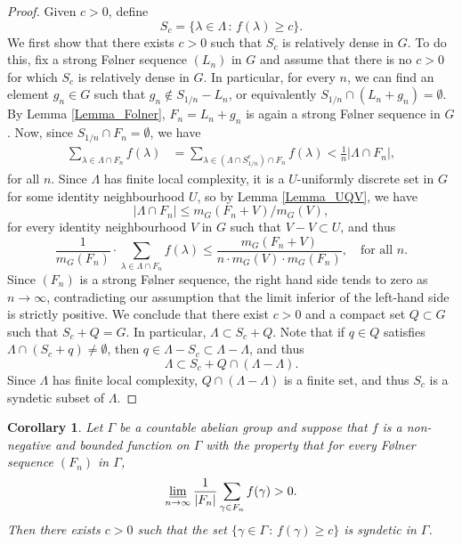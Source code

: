 \documentclass[12pt,reqno,a4paper]{amsart}
\numberwithin{equation}{section}
\newcommand{\ra}{\rightarrow}
\theoremstyle{theorem}
\newtheorem{corollary}[theorem]{Corollary}
\theoremstyle{task}
\theoremstyle{definition}
\begin{document}
\begin{proof}
Given $c > 0$, define
\[
S_c = \{ \lambda \in \Lambda \, : \, f(\lambda) \geq c \}.
\]
We first show that there exists $c > 0$ such that $S_c$ is relatively dense in $G$. To do this, fix a strong F\o lner sequence $(L_n)$ in $G$ and assume that there is no $c > 0$ for which $S_c$ is relatively dense in $G$. In particular, for every $n$, we can find an element $g_n \in G$ such that $g_n \notin S_{1/n} - L_n$, or equivalently 
$S_{1/n} \cap (L_n + g_n) = \emptyset$. By Lemma \ref{Lemma_Folner}, $F_n = L_n + g_n$ is again a strong F\o lner sequence in $G$. Now, since $S_{1/n} \cap F_n = \emptyset$, we have
\begin{align*}
\sum_{\lambda \in \Lambda \cap F_n} f(\lambda)
&= \sum_{\lambda \in (\Lambda \cap S^c_{1/n}) \cap F_n} f(\lambda) < \frac{1}{n} |\Lambda \cap F_n|,
\end{align*}
for all $n$. Since $\Lambda$ has finite local complexity, it is a $U$-uniformly discrete set in $G$ for some identity neighbourhood $U$, so by Lemma \ref{Lemma_UQV},
we have 
\[
|\Lambda \cap F_n| \leq m_G(F_n+V)/m_G(V),
\]
for every identity neighbourhood $V$ in $G$ such that $V-V \subset U$, and thus
\[
\frac{1}{m_G(F_n)} \cdot 
\sum_{\lambda \in \Lambda \cap F_n} f(\lambda) \leq \frac{m_G(F_n +V)}{n \cdot m_G(V) \cdot m_G(F_n)}, \quad \textrm{for all $n$}.
\]
Since $(F_n)$ is a strong F\o lner sequence, the right hand side tends to zero as $n \ra \infty$,
contradicting our assumption that the limit inferior of the left-hand side is strictly positive. We conclude that there exist $c > 0$ and a compact set $Q \subset G$ such that $S_c + Q = G$. In particular, $\Lambda \subset S_c + Q$. Note that if $q \in Q$
satisfies $\Lambda \cap (S_c + q) \neq \emptyset$, then $q \in \Lambda - S_c \subset \Lambda - \Lambda$, and thus
\[
\Lambda \subset S_c + Q \cap (\Lambda - \Lambda).
\]
Since $\Lambda$ has finite local complexity, $Q \cap (\Lambda - \Lambda)$ is a finite set, and thus $S_c$ is a syndetic subset of $\Lambda$.
\end{proof}

\begin{corollary}
\label{cor_syndav}
Let $\Gamma$ be a countable abelian group and suppose that $f$ is a non-negative and 
bounded function on $\Gamma$ with the property that for every F\o lner sequence $(F_n)$ in $\Gamma$, 
\[
\varliminf_{n \ra \infty} \frac{1}{|F_n|} \sum_{\gamma \in F_n} f(\gamma) > 0.
\]
Then there exists $c > 0$ such that the set $\{\gamma \in \Gamma \, : \, f(\gamma) \geq c\}$
is syndetic in $\Gamma$.
\end{corollary}
\end{document}
